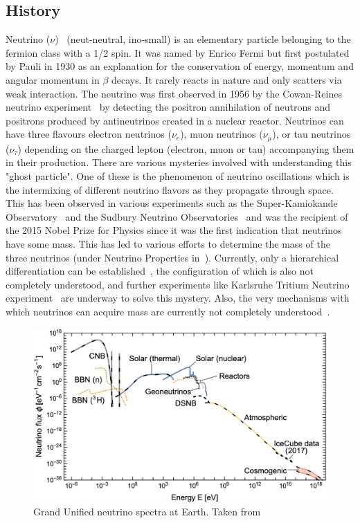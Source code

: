 \subsection{History}
Neutrino ($\nu$)~\cite{10.1063/1.2995181} (neut-neutral, ino-small) is an elementary particle belonging to the fermion class with a 1/2 spin. It was named by Enrico Fermi but first postulated by Pauli in 1930 as an explanation for the conservation of energy, momentum and angular momentum in $\beta$ decays. It rarely reacts in nature and only scatters via weak interaction. The neutrino was first observed in 1956 by the Cowan-Reines neutrino experiment~\cite{PhysRev.92.830} by detecting the positron annihilation of neutrons and positrons produced by antineutrinos created in a nuclear reactor. Neutrinos can have three flavours electron neutrinos ($\nu_e$), muon neutrinos ($\nu_{\mu}$), or tau neutrinos ($\nu_{\tau}$) depending on the charged lepton (electron, muon or tau) accompanying them in their production. There are various mysteries involved with understanding this "ghost particle". One of these is the phenomenon of neutrino oscillations which is the intermixing of different neutrino flavors as they propagate through space. This has been observed in various experiments such as the Super-Kamiokande Observatory~\cite{Fukuda_1998} and the Sudbury Neutrino Observatories~\cite{BELLERIVE201630} and was the recipient of the 2015 Nobel Prize for Physics since it was the first indication that neutrinos have some mass. This has led to various efforts to determine the mass of the three neutrinos (under Neutrino Properties in~\cite{ParticleDataGroup:2024cfk}). Currently, only a hierarchical differentiation can be established~\cite{Qian_2015}, the configuration of which is also not completely understood, and further experiments like Karlsruhe Tritium Neutrino experiment~\cite{aker2024directneutrinomassmeasurementbased} are underway to solve this mystery. Also, the very mechanisms with which neutrinos can acquire mass are currently not completely understood~\cite{CERN_courier_nu_mass}. 
\begin{figure}[t!]
  \centering
  \includegraphics[width=14.5cm]{thesis_figures/CRnNu/Neutrino spectra.jpg}
  \caption{Grand Unified neutrino spectra at Earth. Taken from ~\cite{Vitagliano:2019yzm}}
  \label{fig:Neutrino-spectra}
\end{figure}

